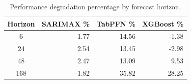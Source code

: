 \begin{table}[h]
\centering
\begin{tabular}{crrr}
\toprule
Horizon & SARIMAX \% & TabPFN \% & XGBoost \% \\
\midrule
6 & 1.77 & 14.56 & -1.38 \\
24 & 2.54 & 13.45 & -2.98 \\
48 & 2.47 & 13.09 & 9.53 \\
168 & -1.82 & 35.82 & 28.25 \\
\bottomrule
\end{tabular}
\caption{Performance degradation percentage by forecast horizon.}
\label{tab:degradation_by_horizon}
\end{table}
